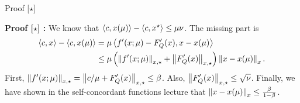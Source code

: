 \documentclass[9pt]{beamer}
\begin{document}
\begin{frame}{Proof [$\star$]}

  \textbf{Proof [$\star$] :} We know that $\left<c, x(\mu)\right> - \left<c, x^\star\right> \leq \mu \nu$. The missing part is
  \begin{align*}
    \left<c, x\right> - \left<c, x(\mu)\right> & = \mu \left<f'(x;\mu)- F'_Q(x), x-x(\mu)\right>\\
                                           & \leq \mu \left(\left\|f'(x;\mu)\right\|_{x,\star}+\left\|F'_Q(x)\right\|_{x,\star}\right)\left\|x-x(\mu)\right\|_{x}.
  \end{align*}
  First, $\left\|f'(x;\mu)\right\|_{x,\star} = \left\|c/\mu+ F'_Q(x)\right\|_{x,\star}\leq \beta$. Also, $\left\|F'_Q(x)\right\|_{x, \star}\leq \sqrt{\nu}$. Finally, we have shown in the self-concordant functions lecture that $\left\|x-x(\mu)\right\|_x\leq \frac{\beta}{1-\beta}$.
  
\end{frame}
\end{document}
